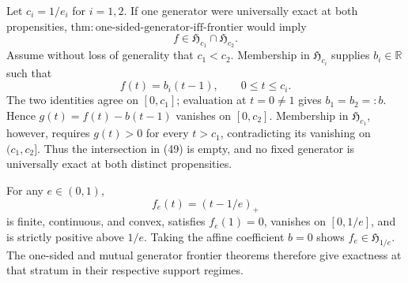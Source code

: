 Let \(c_i=1/e_i\) for \(i=1,2\).  If one generator were universally exact at both propensities, \(\mathrm{thm:one\text{-}sided\text{-}generator\text{-}iff\text{-}frontier}\) would imply
\[
 f\in\mathfrak H_{c_1}\cap\mathfrak H_{c_2}. \tag{49}
\]
Assume without loss of generality that \(c_1<c_2\).  Membership in \(\mathfrak H_{c_i}\) supplies \(b_i\in\mathbb R\) such that
\[
 f(t)=b_i(t-1),\qquad 0\le t\le c_i.
\]
The two identities agree on \([0,c_1]\); evaluation at \(t=0\ne1\) gives \(b_1=b_2=:b\).  Hence \(g(t)=f(t)-b(t-1)\) vanishes on \([0,c_2]\).  Membership in \(\mathfrak H_{c_1}\), however, requires \(g(t)>0\) for every \(t>c_1\), contradicting its vanishing on \((c_1,c_2]\).  Thus the intersection in (49) is empty, and no fixed generator is universally exact at both distinct propensities.

For any \(e\in(0,1)\),
\[
 f_e(t)=(t-1/e)_+
\]
is finite, continuous, and convex, satisfies \(f_e(1)=0\), vanishes on \([0,1/e]\), and is strictly positive above \(1/e\).  Taking the affine coefficient \(b=0\) shows \(f_e\in\mathfrak H_{1/e}\).  The one-sided and mutual generator frontier theorems therefore give exactness at that stratum in their respective support regimes.